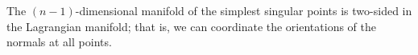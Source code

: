 The $(n - 1)$-dimensional manifold of the simplest singular points is two-sided in the Lagrangian manifold; that is, we can coordinate the orientations of the normals at all points.
